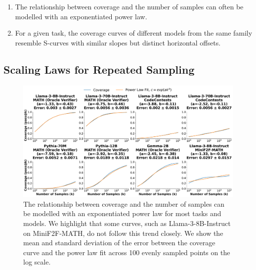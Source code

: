 \documentclass[11pt]{article}
\begin{document}
\begin{enumerate}
    \item The relationship between coverage and the number of samples can often be modelled with an exponentiated power law.
    \item For a given task, the coverage curves of different models from the same family resemble S-curves with similar slopes but distinct horizontal offsets.
\end{enumerate}


\subsection{Scaling Laws for Repeated Sampling}


\begin{figure}
    \centering
    \includegraphics[width=\textwidth]{figures/fit_curves2.pdf}
    
    \caption{The relationship between coverage and the number of samples can be modelled with an exponentiated power law for most tasks and models. We highlight that some curves, such as Llama-3-8B-Instruct on MiniF2F-MATH, do not follow this trend closely. We show the mean and standard deviation of the error between the coverage curve and the power law fit across 100 evenly sampled points on the log scale.}
    
    \label{fig:powerlaw}
\end{figure}
\end{document}
